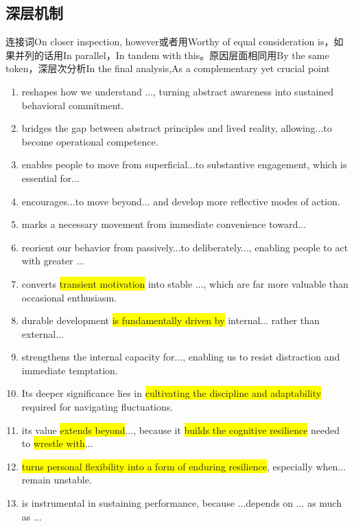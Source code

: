 ﻿\documentclass[lang=cn,11pt]{elegantbook}
\begin{document}
\subsection{深层机制}

连接词On closer inspection, however或者用Worthy of equal consideration is，如果并列的话用In parallel，In tandem with this。原因层面相同用By the same token，深层次分析In the final analysis,As a complementary yet crucial point

\begin{enumerate}
    \item reshapes how we understand ..., turning abstract awareness into sustained behavioral commitment.
    \item bridges the gap between abstract principles and lived reality, allowing...to become operational competence.
    \item enables people to move from superficial...to substantive engagement, which is essential for...
    \item encourages...to move beyond... and develop more reflective modes of action.
    \item marks a necessary movement from immediate convenience toward...
    
    \item reorient our behavior from passively...to deliberately..., enabling people to act with greater ...
    \item converts \colorbox{yellow}{transient motivation} into stable ..., which are far more valuable than occasional enthusiasm.
    \item durable development \colorbox{yellow}{is fundamentally driven by} internal... rather than external...
    \item strengthens the internal capacity for..., enabling us to resist distraction and immediate temptation.
    
    \item Its deeper significance lies in \colorbox{yellow}{cultivating the discipline and adaptability} required for navigating fluctuations.
    \item its value \colorbox{yellow}{extends beyond}..., because it \colorbox{yellow}{builds the cognitive resilience} needed to \colorbox{yellow}{wrestle with}...
    \item \colorbox{yellow}{turns personal flexibility into a form of enduring resilience}, especially when... remain unstable.
    \item is instrumental in sustaining performance, because ...depends on ... as much as ...
    

\end{enumerate}
\end{document}
